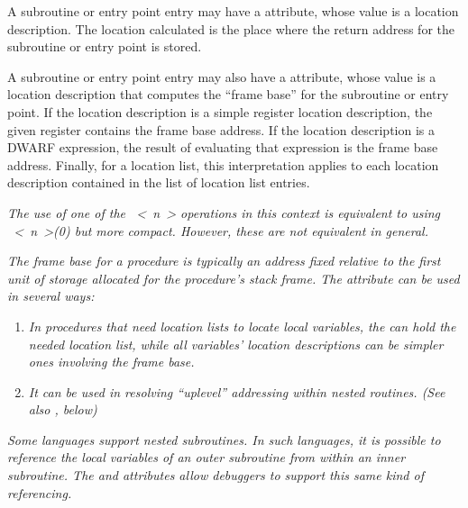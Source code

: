 A subroutine or entry point entry may have a 
attribute, whose value is a location description. The location
calculated is the place where the return address for the
subroutine or entry point is stored.

A subroutine or entry point entry may also have a
 attribute, whose value is a location
description that computes the “frame base” for the
subroutine or entry point. If the location description is
a simple register location description, the given register
contains the frame base address. If the location description is
a DWARF expression, the result of evaluating that expression
is the frame base address. Finally, for a location list,
this interpretation applies to each location description
contained in the list of location list entries.

\textit{The use of one of the ~\textless~n~\textgreater 
operations in this
context is equivalent to using 
~\textless~n~\textgreater(0) 
but more
compact. However, these are not equivalent in general.}

\textit{The frame base for a procedure is typically an address fixed
relative to the first unit of storage allocated for the
procedure’s stack frame. The  attribute
can be used in several ways:}

\begin{enumerate}[1.]
\item \textit{In procedures that need location lists to locate local
variables, the  can hold the needed location
list, while all variables’ location descriptions can be
simpler ones involving the frame base.}

\item \textit{It can be used in resolving ``up\dash level'' addressing
within nested routines. 
(See also , below)}
\end{enumerate}

\textit{Some languages support nested subroutines. In such languages,
it is possible to reference the local variables of an
outer subroutine from within an inner subroutine. The
 and  attributes allow
debuggers to support this same kind of referencing.}

